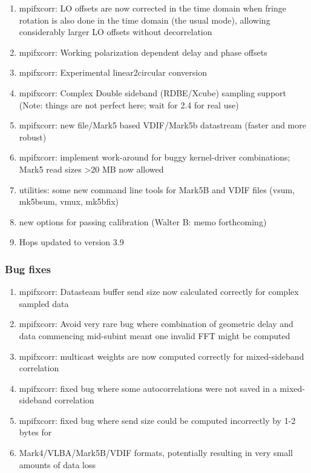 \begin{enumerate}

\item mpifxcorr: LO offsets are now corrected in the time domain when fringe rotation is also done in the time domain (the usual mode), allowing considerably larger LO offsets without decorrelation
\item mpifxcorr: Working polarization dependent delay and phase offsets
\item mpifxcorr: Experimental linear2circular conversion
\item mpifxcorr: Complex Double sideband (RDBE/Xcube) sampling support (Note: things are not perfect here; wait for 2.4 for real use)
\item mpifxcorr: new file/Mark5 based VDIF/Mark5b datastream (faster and more robust)
\item mpifxcorr: implement work-around for buggy kernel-driver combinations; Mark5 read sizes >20 MB now allowed
\item utilities: some new command line tools for Mark5B and VDIF files (vsum, mk5bsum, vmux, mk5bfix)
\item new options for passing calibration (Walter B: memo forthcoming)
\item Hops updated to version 3.9

\end{enumerate}

\subsubsection{Bug fixes}

\begin{enumerate}

\item mpifxcorr: Datasteam buffer send size now calculated correctly for complex sampled data
\item mpifxcorr: Avoid very rare bug where combination of geometric delay and data commencing mid-subint meant one invalid FFT might be computed
\item mpifxcorr: multicast weights are now computed correctly for mixed-sideband correlation
\item mpifxcorr: fixed bug where some autocorrelations were not saved in a mixed-sideband correlation
\item mpifxcorr: fixed bug where send size could be computed incorrectly by 1-2 bytes for
\item Mark4/VLBA/Mark5B/VDIF formats, potentially resulting in very small amounts of data loss

\end{enumerate}

